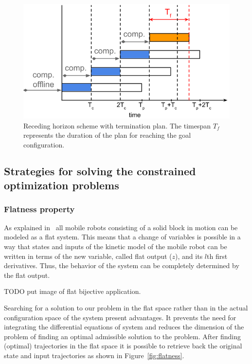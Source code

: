 \documentclass[eprint]{actapoly}
\begin{document}
\begin{figure}[!h]
  \centering
  \includegraphics[width=\linewidth]{./images/recedinghorizon.png} %
  \caption{Receding horizon scheme with termination plan. The timespan $T_f$ represents the duration of the plan for reaching the goal configuration.\label{fig:recedinghor}}
\end{figure}



\subsection{Strategies for solving the constrained optimization problems}



\subsubsection{Flatness property}

As explained in~\cite{Defoort2007a} all mobile robots consisting of a solid
block in motion can be modeled as a flat system. 
This means that a change of variables is possible in a way that states and
inputs of the kinetic model of the mobile robot can be written in terms
of the new variable, called flat output ($z$), and its $l$th first derivatives.
Thus, the behavior of the system can be completely determined by the flat
output.

TODO put image of flat bijective application.

Searching for a solution to our problem in the flat space rather than in
the actual configuration space of the system present advantages.
It prevents the need for integrating the differential equations
of system and reduces the dimension of the problem of finding an optimal
admissible solution to the problem.
After finding (optimal) trajectories in the flat space it is possible
to retrieve back the original state and input trajectories as shown in
Figure~\ref{fig:flatness}.
\end{document}
